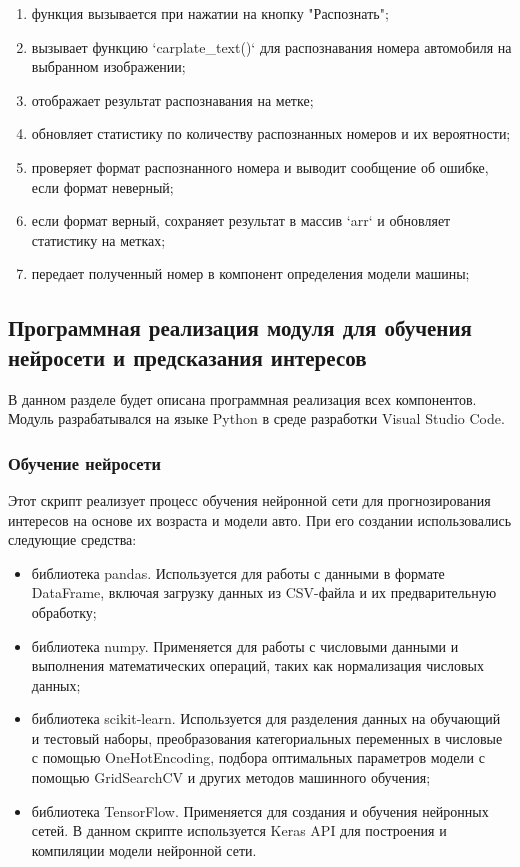 \begin{enumerate}
\begin{enumerate}
                \item функция вызывается при нажатии на кнопку "Распознать";
                \item вызывает функцию `carplate\_text()` для распознавания номера автомобиля на выбранном изображении;
                \item отображает результат распознавания на метке;
                \item обновляет статистику по количеству распознанных номеров и их вероятности;
                \item проверяет формат распознанного номера и выводит сообщение об ошибке, если формат неверный;
                \item если формат верный, сохраняет результат в массив `arr` и обновляет статистику на метках;
                \item передает полученный номер в компонент определения модели машины;   
            \end{enumerate} 
    \end{enumerate}


\subsection{Программная реализация модуля для обучения нейросети и предсказания интересов}

В данном разделе будет описана программная реализация всех компонентов. Модуль разрабатывался на языке Python в среде разработки Visual Studio Code.

\subsubsection{Обучение нейросети}
Этот скрипт реализует процесс обучения нейронной сети для прогнозирования интересов на основе их возраста и модели авто. При его создании использовались следующие средства:
\begin{itemize}
    \item библиотека pandas. Используется для работы с данными в формате DataFrame, включая загрузку данных из CSV-файла и их предварительную обработку;
    \item библиотека numpy. Применяется для работы с числовыми данными и выполнения математических операций, таких как нормализация числовых данных;
    \item библиотека scikit-learn. Используется для разделения данных на обучающий и тестовый наборы, преобразования категориальных переменных в числовые с помощью OneHotEncoding, подбора оптимальных параметров модели с помощью GridSearchCV и других методов машинного обучения;
    \item библиотека TensorFlow. Применяется для создания и обучения нейронных сетей. В данном скрипте используется Keras API для построения и компиляции модели нейронной сети.
\end{itemize}

